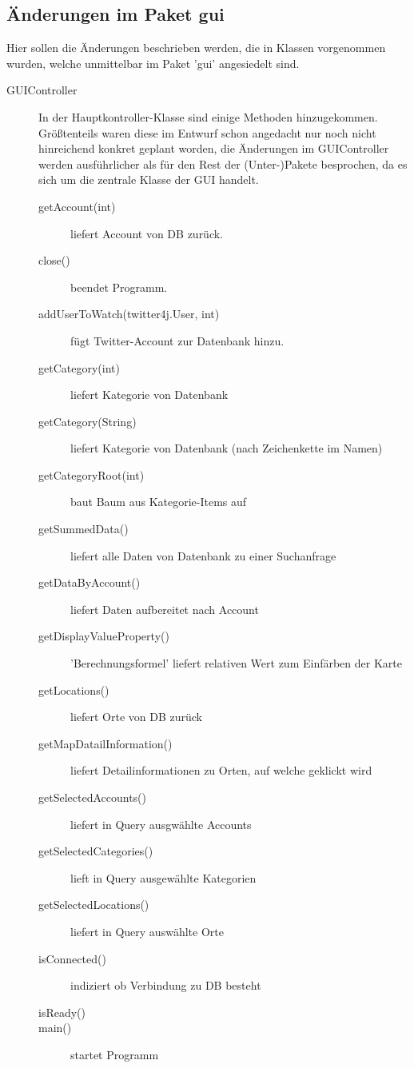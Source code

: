 \subsection{Änderungen im Paket gui}
	Hier sollen die Änderungen beschrieben werden, die in Klassen vorgenommen wurden, welche unmittelbar im Paket 'gui' angesiedelt sind.
	\begin{description}
		\item [GUIController] 
		\quad 
		In der Hauptkontroller-Klasse sind einige Methoden hinzugekommen. Größtenteils waren diese im Entwurf schon angedacht nur noch nicht hinreichend konkret geplant worden, die Änderungen im GUIController werden ausführlicher als für den Rest der (Unter-)Pakete besprochen, da es sich um die zentrale Klasse der GUI handelt.
		\begin{description}
			\item[getAccount(int)] liefert Account von DB zurück.
			\item[close()] beendet Programm.
			\item[addUserToWatch(twitter4j.User, int)] fügt Twitter-Account zur Datenbank hinzu.
			\item[getCategory(int)] liefert Kategorie von Datenbank
			\item[getCategory(String)] liefert Kategorie von Datenbank (nach Zeichenkette im Namen)
			\item[getCategoryRoot(int\text{[]})] baut Baum aus Kategorie-Items auf
			\item[getSummedData()] liefert alle Daten von Datenbank zu einer Suchanfrage
			\item[getDataByAccount()] liefert Daten aufbereitet nach Account
			\item[getDisplayValueProperty()] 'Berechnungsformel' liefert relativen Wert zum Einfärben der Karte
			\item[getLocations()] liefert Orte von DB zurück
			\item[getMapDatailInformation()] liefert Detailinformationen zu Orten, auf welche geklickt wird
			\item[getSelectedAccounts()] liefert in Query ausgwählte Accounts
			\item[getSelectedCategories()] lieft in Query ausgewählte Kategorien
			\item[getSelectedLocations()] liefert in Query auswählte Orte
			\item[isConnected()] indiziert ob Verbindung zu DB besteht
			\item[isReady()]
			\item[main()] startet Programm

\end{description}
\end{description}
